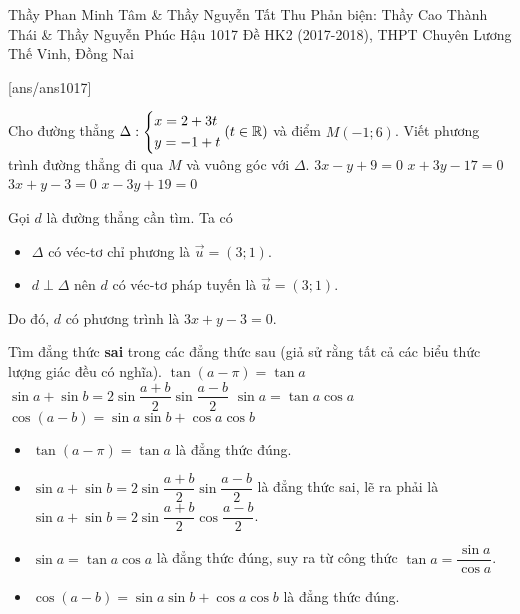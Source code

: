 \begin{name}
		{Thầy Phan Minh Tâm \& Thầy Nguyễn Tất Thu
			\newline Phản biện: Thầy Cao Thành Thái \& Thầy Nguyễn Phúc Hậu}
		{1017 Đề HK2 (2017-2018), THPT Chuyên Lương Thế Vinh, Đồng Nai}
	\end{name}
	\setcounter{ex}{0}
	[ans/ans1017]
\begin{ex}%
	Cho đường thẳng $\Delta:\left\{\begin{aligned}&x=2+3t\\&y=-1+t\end{aligned}\right.(t\in\mathbb{R})$ và điểm $M(-1;6)$. Viết phương trình đường thẳng đi qua $M$ và vuông góc với $\Delta$.
	\choice
	{$3x-y+9=0$}
	{$x+3y-17=0$}
	{\True $3x+y-3=0$}
	{$x-3y+19=0$}
	\loigiai
	{
		Gọi $d$ là đường thẳng cần tìm. Ta có
		\begin{itemize}
			\item $\Delta$ có véc-tơ chỉ phương là $\vec{u}=(3;1)$.
			\item $d\perp\Delta$ nên $d$ có véc-tơ pháp tuyến là $\vec{u}=(3;1)$.
		\end{itemize}
		Do đó, $d$ có phương trình là $3x+y-3=0$.
	}
\end{ex}
\begin{ex}%
	Tìm đẳng thức \textbf{sai} trong các đẳng thức sau (giả sử rằng tất cả các biểu thức lượng giác đều có nghĩa).
	\choice
	{$\tan(a-\pi)=\tan a$}
	{\True $\sin a+\sin b=2\sin\dfrac{a+b}{2}\sin\dfrac{a-b}{2}$}
	{$\sin a=\tan a\cos a$}
	{$\cos(a-b)=\sin a\sin b+\cos a\cos b$}
	\loigiai
	{
		\begin{itemize}
			\item $\tan(a-\pi)=\tan a$ là đẳng thức đúng.
			\item $\sin a+\sin b=2\sin\dfrac{a+b}{2}\sin\dfrac{a-b}{2}$ là đẳng thức sai, lẽ ra phải là $\sin a+\sin b=2\sin\dfrac{a+b}{2}\cos\dfrac{a-b}{2}$.
			\item $\sin a=\tan a\cos a$ là đẳng thức đúng, suy ra từ công thức $\tan a=\dfrac{\sin a}{\cos a}$.
			\item $\cos(a-b)=\sin a\sin b+\cos a\cos b$ là đẳng thức đúng.
		\end{itemize}
	}
\end{ex}
